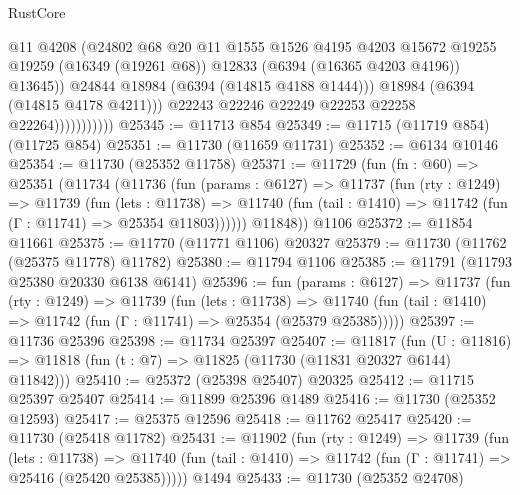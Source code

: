 \begin{lexlean}{RustCore}
\begin{coremodule}
                                @11
                                @4208
                                (@24802
                                  @68
                                  @20
                                  @11
                                  @1555
                                  @1526
                                  @4195
                                  @4203
                                  @15672
                                  @19255
                                  @19259
                                  (@16349 (@19261 @68))
                                  @12833
                                  (@6394 (@16365 @4203 @4196))
                                  @13645))
                              @24844
                              @18984
                              (@6394 (@14815 @4188 @1444)))
                            @18984
                            (@6394 (@14815 @4178 @4211)))
                          @22243
                          @22246
                          @22249
                          @22253
                          @22258
                          @22264)))))))))))
@25345 := @11713 @854
@25349 := @11715 (@11719 @854) (@11725 @854)
@25351 := @11730 (@11659 @11731)
@25352 := @6134 @10146
@25354 := @11730 (@25352 @11758)
@25371 := @11729
    (fun (fn : @60) =>
    @25351
      (@11734
        (@11736
          (fun (params : @6127) =>
          @11737
            (fun (rty : @1249) =>
            @11739
              (fun (lets : @11738) =>
              @11740 (fun (tail : @1410) => @11742 (fun (Γ : @11741) => @25354 @11803))))))
        @11848))
    @1106
@25372 := @11854 @11661
@25375 := @11770 (@11771 @1106) @20327
@25379 := @11730 (@11762 (@25375 @11778) @11782)
@25380 := @11794 @1106
@25385 := @11791 (@11793 @25380 @20330 @6138 @6141)
@25396 := fun (params : @6127) =>
  @11737
    (fun (rty : @1249) =>
    @11739
      (fun (lets : @11738) =>
      @11740 (fun (tail : @1410) => @11742 (fun (Γ : @11741) => @25354 (@25379 @25385)))))
@25397 := @11736 @25396
@25398 := @11734 @25397
@25407 := @11817
    (fun (U : @11816) => @11818 (fun (t : @7) => @11825 (@11730 (@11831 @20327 @6144) @11842)))
@25410 := @25372 (@25398 @25407) @20325
@25412 := @11715 @25397 @25407
@25414 := @11899 @25396 @1489
@25416 := @11730 (@25352 @12593)
@25417 := @25375 @12596
@25418 := @11762 @25417
@25420 := @11730 (@25418 @11782)
@25431 := @11902
    (fun (rty : @1249) =>
    @11739
      (fun (lets : @11738) =>
      @11740 (fun (tail : @1410) => @11742 (fun (Γ : @11741) => @25416 (@25420 @25385)))))
    @1494
@25433 := @11730 (@25352 @24708)

\end{coremodule}
\end{lexlean}
